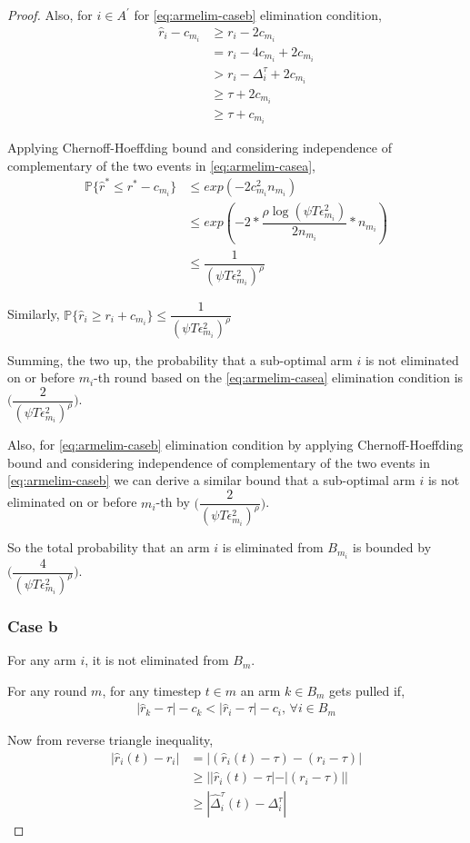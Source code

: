 \begin{proof}
Also, for ${i} \in A^{'}$ for \ref{eq:armelim-caseb} elimination condition, 
\begin{align*}
\hat{r}_{i} - c_{m_{i}}&\geq r_{i} - 2c_{m_{i}} \\
&= r_{i} - 4c_{m_{i}} + 2c_{m_{i}} \\
&> r_{i} - \Delta_{i}^{\tau} + 2c_{m_{i}}\\
&\geq \tau + 2c_{m_{i}} \\
&\geq \tau + c_{m_{i}}
\end{align*}

Applying Chernoff-Hoeffding bound and considering independence of complementary of the two events in \ref{eq:armelim-casea},
  \begin{align*}
\mathbb{P}\lbrace\hat{r}^{*}\leq r^{*} - c_{m_{i}}\rbrace &\leq exp(-2c_{m_{i}}^{2}n_{m_{i}})\\
&\leq exp(-2 * \dfrac{\rho\log (\psi T\epsilon_{m_{i}}^{2})}{2 n_{m_{i}}} *n_{m_{i}})\\
&\leq \dfrac{1}{(\psi T\epsilon_{m_{i}}^{2})^{\rho}}   
  \end{align*}
  
Similarly, $\mathbb{P}\lbrace\hat{r}_{i}\geq r_{i} + c_{m_{i}}\rbrace\leq \dfrac{1}{(\psi  T\epsilon_{m_{i}}^{2})^{\rho}}$
 
Summing, the two up, the probability that a sub-optimal arm ${i}$ is not eliminated on or before $m_{i}$-th round based on the \ref{eq:armelim-casea} elimination condition is  $\bigg(\dfrac{2}{(\psi T\epsilon_{m_{i}}^{2})^{\rho}}\bigg)$. 

Also, for \ref{eq:armelim-caseb} elimination condition by applying Chernoff-Hoeffding bound and considering independence of complementary of the two events in \ref{eq:armelim-caseb} we can derive a similar bound that a sub-optimal arm ${i}$ is not eliminated on or before $m_{i}$-th by $\bigg(\dfrac{2}{(\psi T\epsilon_{m_{i}}^{2})^{\rho}}\bigg)$. 

So the total probability that an arm $i$ is eliminated from $B_{m_{i}}$ is bounded by $\bigg(\dfrac{4}{(\psi T\epsilon_{m_{i}}^{2})^{\rho}}\bigg)$. 

\subsubsection{Case b}
For any arm $i$, it is not eliminated from $B_{m}$.

	For any round $m$, for any timestep $t\in m$ an arm $k\in B_{m}$ gets pulled if,
\begin{align*}
|\hat{r}_{k} - \tau| - c_{k} < |\hat{r}_{i} - \tau| - c_{i} \text{, } \forall i\in B_{m}
\end{align*}

Now from reverse triangle inequality,
\begin{align*}
|\hat{r}_{i}(t) - r_{i}|&=|(\hat{r}_{i}(t)-\tau) - (r_{i}-\tau)|\\
&\geq ||\hat{r}_{i}(t)-\tau|-|(r_{i}-\tau)||\\
&\geq |\hat{\Delta}_{i}^{\tau}(t) - \Delta_{i}^{\tau}|
\end{align*}

\end{proof}